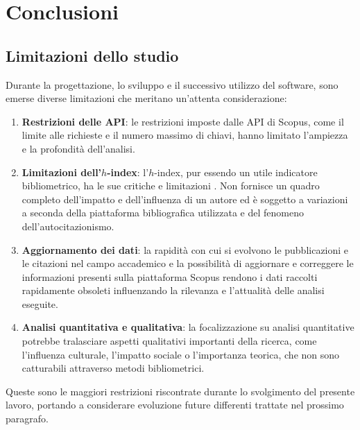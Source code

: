 \chapter{Conclusioni}

\section{Limitazioni dello studio}
Durante la progettazione, lo sviluppo e il successivo utilizzo del software, sono emerse diverse limitazioni che meritano un'attenta considerazione:

\begin{enumerate}
    \item \textbf{Restrizioni delle API}: le restrizioni imposte dalle API di Scopus, come il limite alle richieste e il numero massimo di chiavi, hanno limitato l'ampiezza e la profondità dell'analisi.

    \item \textbf{Limitazioni dell'$h$-index}: l'$h$-index, pur essendo un utile indicatore bibliometrico, ha le sue critiche e limitazioni \cite{ding2020exploring}. Non fornisce un quadro completo dell'impatto e dell'influenza di un autore ed è soggetto a variazioni a seconda della piattaforma bibliografica utilizzata e del fenomeno dell’autocitazionismo.

    \item \textbf{Aggiornamento dei dati}: la rapidità con cui si evolvono le pubblicazioni e le citazioni nel campo accademico e la possibilità di aggiornare e correggere le informazioni presenti sulla piattaforma Scopus rendono i dati raccolti rapidamente obsoleti influenzando la rilevanza e l'attualità delle analisi eseguite.
    
    \item \textbf{Analisi quantitativa e qualitativa}: la focalizzazione su analisi quantitative potrebbe tralasciare aspetti qualitativi importanti della ricerca, come l'influenza culturale, l'impatto sociale o l'importanza teorica, che non sono catturabili attraverso metodi bibliometrici.

\end{enumerate}

Queste sono le maggiori restrizioni riscontrate durante lo svolgimento del presente lavoro, portando a considerare evoluzione future differenti trattate nel prossimo paragrafo.


